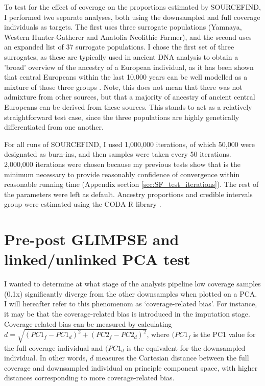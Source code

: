 {To test for the effect of coverage on the proportions estimated by SOURCEFIND, I performed two separate analyses, both using the downsampled and full coverage individuals as targets. The first uses three surrogate populations (Yamnaya, Western Hunter-Gatherer and Anatolia Neolithic Farmer), and the second uses an expanded list of 37 surrogate populations. I chose the first set of three surrogates, as these are typically used in ancient DNA analysis to obtain a 'broad' overview of the ancestry of a European individual, as it has been shown that central Europeans within the last 10,000 years can be well modelled as a mixture of those three groups \cite{Lazaridis2014, Haak2015}. Note, this does not mean that there was not admixture from other sources, but that a majority of ancestry of ancient central Europeans can be derived from these sources. This stands to act as a relatively straightforward test case, since the three populations are highly genetically differentiated from one another.

For all runs of SOURCEFIND, I used 1,000,000 iterations, of which 50,000 were designated as burn-ins, and then samples were taken every 50 iterations. 2,000,000 iterations were chosen because my previous tests show that is the minimum necessary to provide reasonably confidence of convergence within reasonable running time (Appendix section \ref{sec:SF_test_iterations}). The rest of the parameters were left as default. Ancestry proportions and credible intervals group were estimated using the CODA R library \cite{oro22547}.

\section{Pre-post GLIMPSE and linked/unlinked PCA test}

I wanted to determine at what stage of the analysis pipeline low coverage samples (0.1x) significantly diverge from the other downsamples when plotted on a PCA. I will hereafter refer to this phenomenom as `coverage-related bias'. For instance, it may be that the coverage-related bias is introduced in the imputation stage. Coverage-related bias can be measured by calculating $d = \sqrt{(PC1_{f} - PC1_{d})^2 + (PC2_{f} - PC2_{d})^2}$, where $(PC1_{f}$ is the PC1 value for the full coverage individual and $(PC1_{d}$ is the equivalent for the downsampled individual. In other words, $d$ measures the Cartesian distance between the full coverage and downsampled individual on principle component space, with higher distances corresponding to more coverage-related bias. 

}
